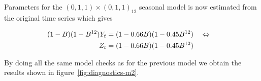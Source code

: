 Parameters for the $(0,1,1)\times(0,1,1)_{12}$ seasonal model is now estimated from the original time series which gives 

\begin{align*}
    (1-B)(1-B^{12})Y_t &= (1-0.66B)(1-0.45B^{12}) \quad\Leftrightarrow\quad\\
    Z_t &= (1-0.66B)(1-0.45B^{12})
\end{align*}

By doing all the same model checks as for the previous model we obtain the results shown in figure~\ref{fig:diagnostics-m2}. \par

\begin{figure}
    \centering
    \mbox{%
         \quad 
    }
    \mbox{%
         \quad 
}
\end{figure}
